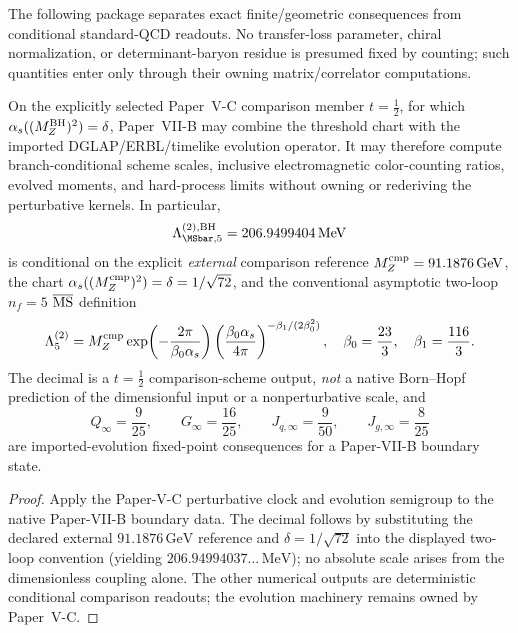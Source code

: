 \documentclass[12pt,a4paper]{article}
\begin{document}
The following package separates exact finite/geometric consequences from conditional standard-QCD readouts.  No transfer-loss parameter, chiral normalization, or determinant-baryon residue is presumed fixed by counting; such quantities enter only through their owning matrix/correlator computations.

\begin{corollary}
\label{p11:cor:derived-perturbative-comparison-package}
On the explicitly selected Paper~V-C comparison member \(t=\tfrac12\), for which
\(\alpha_s((M_Z^{\rm BH})^2)=\delta\), Paper~VII-B may combine the threshold chart with the imported DGLAP/ERBL/timelike evolution operator.  It may therefore compute branch-conditional scheme scales, inclusive electromagnetic color-counting ratios, evolved moments, and hard-process limits without owning or rederiving the perturbative kernels.  In particular,
\begin{equation}
\label{p11:eq:lambda-msbar-five-two-loop-bh}
\Lambda_{\MSbar,5}^{(2),\rm BH}=206.9499404\,\mathrm{MeV}
\end{equation}
is conditional on the explicit \emph{external} comparison reference
\(M_Z^{\rm cmp}=91.1876\,\mathrm{GeV}\), the chart
\(\alpha_s((M_Z^{\rm cmp})^2)=\delta=1/\sqrt{72}\), and the conventional asymptotic two-loop \(n_f=5\) \(\overline{\rm MS}\) definition
\[
\Lambda_5^{(2)}=M_Z^{\rm cmp}\exp\!\left(-\frac{2\pi}{\beta_0\alpha_s}\right)
\left(\frac{\beta_0\alpha_s}{4\pi}\right)^{-\beta_1/(2\beta_0^2)},
\quad \beta_0=\frac{23}{3},\quad\beta_1=\frac{116}{3}.
\]
The decimal is a \(t=\tfrac12\) comparison-scheme output, \emph{not} a native Born--Hopf prediction of the dimensionful input or a nonperturbative scale, and
\begin{equation}
\label{p11:eq:derived-uv-momentum-angular-fixed-point}
Q_\infty=\frac9{25},\qquad G_\infty=\frac{16}{25},\qquad
J_{q,\infty}=\frac9{50},\qquad J_{g,\infty}=\frac8{25}
\end{equation}
are imported-evolution fixed-point consequences for a Paper-VII-B boundary state.
\end{corollary}
\begin{proof}
Apply the Paper-V-C perturbative clock and evolution semigroup to the native
Paper-VII-B boundary data.  The decimal follows by substituting the declared external
\(91.1876\,\mathrm{GeV}\) reference and \(\delta=1/\sqrt{72}\) into the displayed two-loop convention (yielding \(206.94994037\ldots\,\mathrm{MeV}\)); no absolute scale arises from the dimensionless coupling alone. The other numerical outputs are deterministic conditional comparison readouts; the evolution machinery remains owned by Paper~V-C.
\end{proof}
\end{document}
